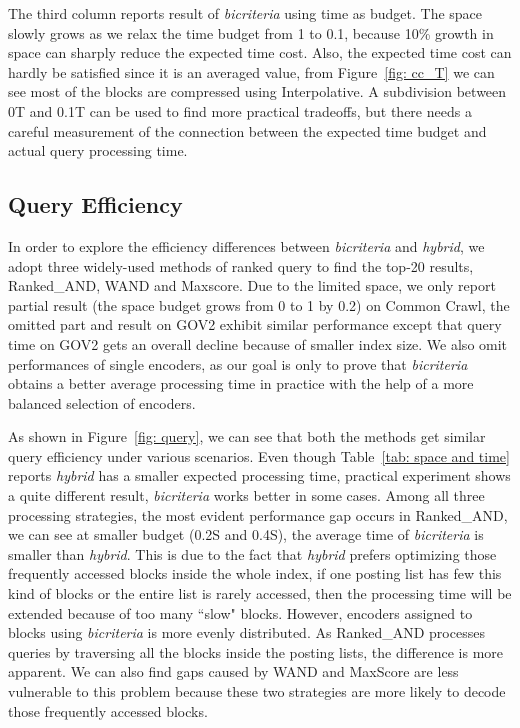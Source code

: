 \documentclass{sig-alternate-05-2015}
\begin{document}
The third column reports result of \textit{bicriteria} using time as budget.
The space slowly grows as we relax the time budget from 1 to 0.1, because 10\% growth in space can sharply reduce the expected time cost.
Also, the expected time cost can hardly be satisfied since it is an averaged value, from Figure~\ref{fig: cc_T} we can see most of the blocks are compressed using Interpolative.
A subdivision between 0T and 0.1T can be used to find more practical tradeoffs, but there needs a careful measurement of the connection between the expected time budget and actual query processing time. 

\subsection{Query Efficiency}

In order to explore the efficiency differences between \textit{bicriteria} and \textit{hybrid}, we adopt three widely-used methods of ranked query to find the top-20 results, Ranked\_AND, WAND and Maxscore.
Due to the limited space, we only report partial result (the space budget grows from 0 to 1 by 0.2) on Common Crawl, the omitted part and result on GOV2 exhibit similar performance except that query time on GOV2 gets an overall decline because of smaller index size.
We also omit performances of single encoders, as our goal is only to prove that \textit{bicriteria} obtains a better average processing time in practice with the help of a more balanced selection of encoders.

As shown in Figure~\ref{fig: query}, we can see that both the methods get similar query efficiency under various scenarios.
Even though Table~\ref{tab: space and time} reports \textit{hybrid} has a smaller expected processing time, practical experiment shows a quite different result, \textit{bicriteria} works better in some cases.
Among all three processing strategies, the most evident performance gap occurs in Ranked\_AND, we can see at smaller budget (0.2S and 0.4S), the average time of \textit{bicriteria} is smaller than \textit{hybrid}.
This is due to the fact that \textit{hybrid} prefers optimizing those frequently accessed blocks inside the whole index, if one posting list has few this kind of blocks or the entire list is rarely accessed, then the processing time will be extended because of too many ``slow" blocks.
However, encoders assigned to blocks using \textit{bicriteria} is more evenly distributed. 
As Ranked\_AND processes queries by traversing all the blocks inside the posting lists, the difference is more apparent.
We can also find gaps caused by WAND and MaxScore are less vulnerable to this problem because these two strategies are more likely to decode those frequently accessed blocks.
\end{document}
